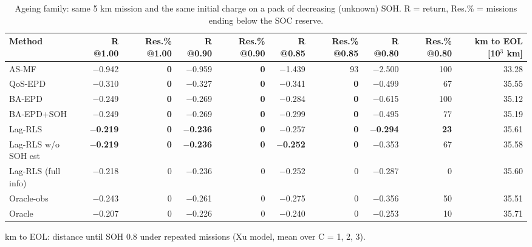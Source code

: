 \begin{table}[t]
\centering
\caption{Ageing family: same 5 km mission and the same initial charge on a pack of decreasing (unknown) SOH. R = return, Res.\% = missions ending below the SOC reserve.}
\label{tab:ageing}
\footnotesize
\setlength{\tabcolsep}{4pt}
\begin{tabular}{lrrrrrrrrr}
\toprule
Method & R @1.00 & Res.\% @1.00 & R @0.90 & Res.\% @0.90 & R @0.85 & Res.\% @0.85 & R @0.80 & Res.\% @0.80 & km to EOL [10$^3$ km] \\
\midrule
AS-MF & $-$0.942 & \textbf{0} & $-$0.959 & \textbf{0} & $-$1.439 & 93 & $-$2.500 & 100 & 33.28 \\
QoS-EPD & $-$0.310 & \textbf{0} & $-$0.327 & \textbf{0} & $-$0.341 & \textbf{0} & $-$0.499 & 67 & 35.55 \\
BA-EPD & $-$0.249 & \textbf{0} & $-$0.269 & \textbf{0} & $-$0.284 & \textbf{0} & $-$0.615 & 100 & 35.12 \\
BA-EPD+SOH & $-$0.249 & \textbf{0} & $-$0.269 & \textbf{0} & $-$0.299 & \textbf{0} & $-$0.495 & 77 & 35.19 \\
\midrule
Lag-RLS & \textbf{$-$0.219} & \textbf{0} & \textbf{$-$0.236} & \textbf{0} & $-$0.257 & \textbf{0} & \textbf{$-$0.294} & \textbf{23} & 35.61 \\
Lag-RLS w/o SOH est & \textbf{$-$0.219} & \textbf{0} & \textbf{$-$0.236} & \textbf{0} & \textbf{$-$0.252} & \textbf{0} & $-$0.353 & 67 & 35.58 \\
\midrule
Lag-RLS (full info) & $-$0.218 & 0 & $-$0.236 & 0 & $-$0.252 & 0 & $-$0.287 & 0 & 35.60 \\
Oracle-obs & $-$0.243 & 0 & $-$0.261 & 0 & $-$0.275 & 0 & $-$0.356 & 50 & 35.51 \\
Oracle & $-$0.207 & 0 & $-$0.226 & 0 & $-$0.240 & 0 & $-$0.253 & 10 & 35.71 \\
\bottomrule
\end{tabular}
\par\vspace{2pt}\parbox{\linewidth}{\scriptsize km to EOL: distance until SOH 0.8 under repeated missions (Xu model, mean over C = 1, 2, 3).}
\end{table}
